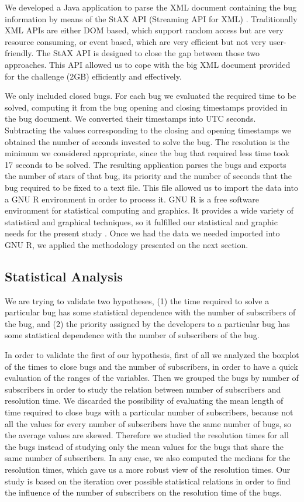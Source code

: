 \documentclass[10pt, conference, compsocconf]{IEEEtran}
\begin{document}
We developed a Java application to parse the XML document containing the bug information by means of the StAX API (Streaming API for XML) \cite{StAX}. Traditionally XML APIs are either DOM based, which support random access but are very resource consuming, or event based, which are very efficient but not very user-friendly. The StAX API is designed to close the gap between those two approaches. This API allowed us to cope with the big XML document provided for the challenge (2GB) efficiently and effectively.

We only included closed bugs. For each bug we evaluated the required time to be solved, computing it from the bug opening and closing timestamps provided in the bug document. We converted their timestamps into UTC seconds. Subtracting the values corresponding to the closing and opening timestamps we obtained the number of seconds invested to solve the bug. The resolution is the minimum we considered appropriate, since the bug that required less time took 17 seconds to be solved. The resulting application parses the bugs and exports the number of stars of that bug, its priority and the number of seconds that the bug required to be fixed to a text file. This file allowed us to import the data into a GNU R \cite{WhatIsR} environment in order to process it. GNU R is a free software environment for statistical computing and graphics. It provides a wide variety of statistical and graphical techniques, so it fulfilled our statistical and graphic needs for the present study \cite{RNutshell}. Once we had the data we needed imported into GNU R, we applied the methodology presented on the next section.

\subsection {Statistical Analysis}
We are trying to validate two hypotheses, (1) the time required to solve a particular bug has some statistical dependence with the number of subscribers of the bug, and (2) the priority assigned by the developers to a particular bug has some statistical dependence with the number of subscribers of the bug.

In order to validate the first of our hypothesis, first of all we analyzed the boxplot of the times to close  bugs and the number of subscribers, in order to have a quick evaluation of the ranges of the variables. Then we grouped the bugs by number of subscribers in order to study the relation between number of subscribers and resolution time. We discarded the possibility of evaluating the mean length of time required to close bugs with a particular number of subscribers, because not all the values for every number of subscribers have the same number of bugs, so the average values are skewed. Therefore we studied the resolution times for all the bugs instead of studying only the mean values for the bugs that share the same number of subscribers. In any case, we also computed the medians for the resolution times, which gave us a more robust view of the resolution times.
Our study is based on the iteration over possible statistical relations in order to find the influence of the number of subscribers on the resolution time of the bugs.
\end{document}
